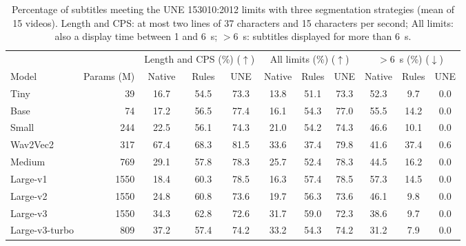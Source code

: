 \begin{table}[!t]
\centering
\caption{Percentage of subtitles meeting the UNE 153010:2012 limits with three segmentation strategies (mean of 15 videos). Length and CPS: at most two lines of 37 characters and 15 characters per second; All limits: also a display time between 1 and 6~s; $>$6~s: subtitles displayed for more than 6~s.}
\label{tab:subtitles}
\scriptsize
\setlength{\tabcolsep}{4pt}
\begin{tabular}{lrccccccccc}
\hline
 & & \multicolumn{3}{c}{Length and CPS (\%) ($\uparrow$)} & \multicolumn{3}{c}{All limits (\%) ($\uparrow$)} & \multicolumn{3}{c}{$>$6~s (\%) ($\downarrow$)} \\
Model & Params (M) & Native & Rules & UNE & Native & Rules & UNE & Native & Rules & UNE \\
\hline
Tiny & 39 & 16.7 & 54.5 & 73.3 & 13.8 & 51.1 & 73.3 & 52.3 & 9.7 & 0.0 \\
Base & 74 & 17.2 & 56.5 & 77.4 & 16.1 & 54.3 & 77.0 & 55.5 & 14.2 & 0.0 \\
Small & 244 & 22.5 & 56.1 & 74.3 & 21.0 & 54.2 & 74.3 & 46.6 & 10.1 & 0.0 \\
Wav2Vec2 & 317 & 67.4 & 68.3 & 81.5 & 33.6 & 37.4 & 79.8 & 41.6 & 37.4 & 0.6 \\
Medium & 769 & 29.1 & 57.8 & 78.3 & 25.7 & 52.4 & 78.3 & 44.5 & 16.2 & 0.0 \\
Large-v1 & 1550 & 18.4 & 60.3 & 78.5 & 16.3 & 57.4 & 78.5 & 57.3 & 14.5 & 0.0 \\
Large-v2 & 1550 & 24.8 & 60.8 & 73.6 & 19.7 & 56.3 & 73.6 & 46.1 & 9.8 & 0.0 \\
Large-v3 & 1550 & 34.3 & 62.8 & 72.6 & 31.7 & 59.0 & 72.3 & 38.6 & 9.7 & 0.0 \\
Large-v3-turbo & 809 & 37.2 & 57.4 & 74.2 & 33.2 & 54.3 & 74.2 & 31.2 & 7.9 & 0.0 \\
\hline
\end{tabular}
\end{table}
